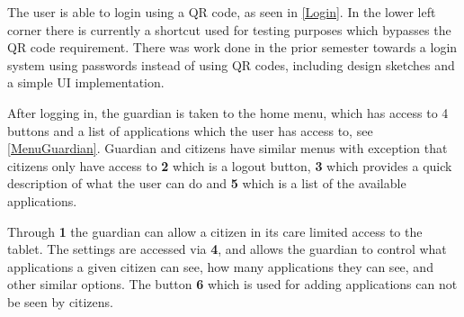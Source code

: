 The user is able to login using a QR code, as seen in \autoref{Login}. In the
lower left corner there is currently a shortcut used for testing purposes which
bypasses the QR code requirement. There was work done in the prior semester
towards a login system using passwords instead of using QR codes, including
design sketches and a simple UI implementation.


After logging in, the guardian is taken to the home menu, which has access to 4
buttons and a list of applications which the user has access to,
see \autoref{MenuGuardian}. Guardian and citizens have similar menus with
exception that citizens only have access to \textbf{2} which is a logout button,
\textbf{3} which provides a quick description of what the user can do and
\textbf{5} which is a list of the available applications.


Through \textbf{1} the guardian can allow a citizen in its care limited access
to the tablet. The settings are accessed via \textbf{4}, and allows the
guardian to control what applications a given citizen can see, how many
applications they can see, and other similar options. The button \textbf{6}
which is used for adding applications can not be seen by citizens.


% 
% 
% 
% 
% 

